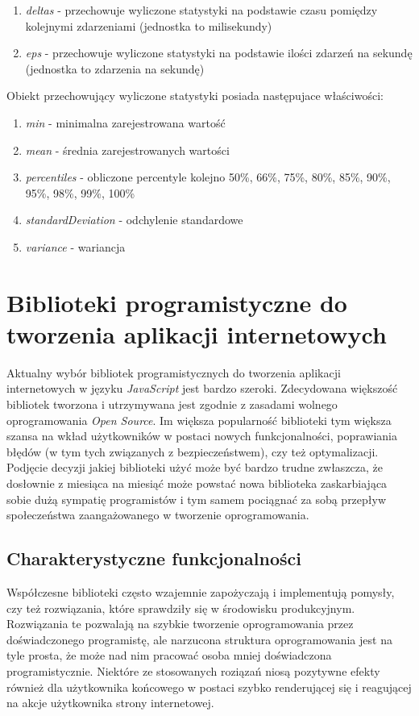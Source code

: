 \documentclass[polish, twoside, 12pt]{mwart}
\let\stdsection\section
\renewcommand*{\section}{\clearpage\stdsection}
\begin{document}
\begin{enumerate}
  \item \emph{deltas} - przechowuje wyliczone statystyki na podstawie czasu pomiędzy kolejnymi zdarzeniami (jednostka to milisekundy)
  \item \emph{eps} - przechowuje wyliczone statystyki na podstawie ilości zdarzeń na sekundę (jednostka to zdarzenia na sekundę)
\end{enumerate}

Obiekt przechowujący wyliczone statystyki posiada następujace właściwości:

\begin{enumerate}
  \item \emph{min} - minimalna zarejestrowana wartość
  \item \emph{mean} - średnia zarejestrowanych wartości
  \item \emph{percentiles} - obliczone percentyle kolejno 50\%, 66\%, 75\%, 80\%, 85\%, 90\%, 95\%, 98\%, 99\%, 100\%
  \item \emph{standardDeviation} - odchylenie standardowe
  \item \emph{variance} - wariancja
\end{enumerate}

\section{Biblioteki programistyczne do tworzenia aplikacji internetowych}

Aktualny wybór bibliotek programistycznych do tworzenia aplikacji internetowych w języku \emph{JavaScript} jest bardzo szeroki. Zdecydowana większość bibliotek tworzona i utrzymywana jest zgodnie z zasadami wolnego oprogramowania \emph{Open Source}. Im większa popularność biblioteki tym większa szansa na wkład użytkowników w postaci nowych funkcjonalności, poprawiania błędów (w tym tych związanych z bezpieczeństwem), czy też optymalizacji. Podjęcie decyzji jakiej biblioteki użyć może być bardzo trudne zwłaszcza, że dosłownie z miesiąca na miesiąć może powstać nowa biblioteka zaskarbiająca sobie dużą sympatię programistów i tym samem pociągnać za sobą przepływ społeczeństwa zaangażowanego w tworzenie oprogramowania. 

\subsection{Charakterystyczne funkcjonalności}

Współczesne biblioteki często wzajemnie zapożyczają i implementują pomysły, czy też rozwiązania, które sprawdziły się w środowisku produkcyjnym. Rozwiązania te pozwalają na szybkie tworzenie oprogramowania przez doświadczonego programistę, ale narzucona struktura oprogramowania jest na tyle prosta, że może nad nim pracować osoba mniej doświadczona programistycznie. Niektóre ze stosowanych roziązań niosą pozytywne efekty również dla użytkownika końcowego w postaci szybko renderującej się i reagującej na akcje użytkownika strony internetowej.
\end{document}
